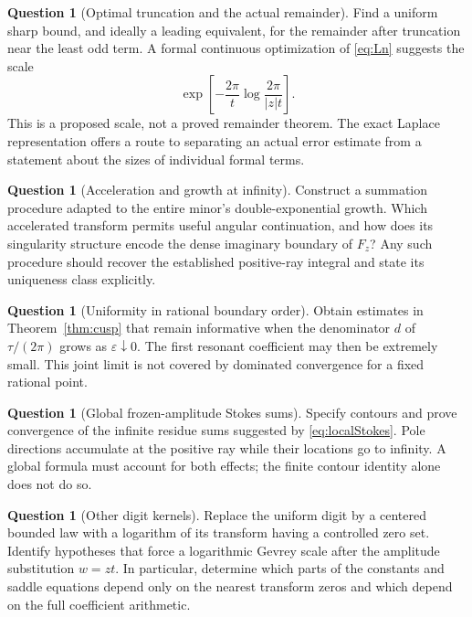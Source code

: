 \documentclass[11pt,a4paper]{article}
\numberwithin{equation}{section}
\theoremstyle{definition}
\newtheorem{question}[theorem]{Question}
\theoremstyle{remark}
\begin{document}
\begin{question}[Optimal truncation and the actual remainder]
Find a uniform sharp bound, and ideally a leading equivalent, for the remainder after truncation near the least odd term. A formal continuous optimization of \eqref{eq:Ln} suggests the scale
\[
 \exp\!\left[-\frac{2\pi}{t}\log\frac{2\pi}{|z|t}\right].
\]
This is a proposed scale, not a proved remainder theorem. The exact Laplace representation offers a route to separating an actual error estimate from a statement about the sizes of individual formal terms.
\end{question}

\begin{question}[Acceleration and growth at infinity]
Construct a summation procedure adapted to the entire minor's double-exponential growth. Which accelerated transform permits useful angular continuation, and how does its singularity structure encode the dense imaginary boundary of $F_z$? Any such procedure should recover the established positive-ray integral and state its uniqueness class explicitly.
\end{question}

\begin{question}[Uniformity in rational boundary order]
Obtain estimates in Theorem~\ref{thm:cusp} that remain informative when the denominator $d$ of $\tau/(2\pi)$ grows as $\varepsilon\downarrow0$. The first resonant coefficient may then be extremely small. This joint limit is not covered by dominated convergence for a fixed rational point.
\end{question}

\begin{question}[Global frozen-amplitude Stokes sums]
Specify contours and prove convergence of the infinite residue sums suggested by \eqref{eq:localStokes}. Pole directions accumulate at the positive ray while their locations go to infinity. A global formula must account for both effects; the finite contour identity alone does not do so.
\end{question}

\begin{question}[Other digit kernels]
Replace the uniform digit by a centered bounded law with a logarithm of its transform having a controlled zero set. Identify hypotheses that force a logarithmic Gevrey scale after the amplitude substitution $w=zt$. In particular, determine which parts of the constants and saddle equations depend only on the nearest transform zeros and which depend on the full coefficient arithmetic.
\end{question}
\end{document}
